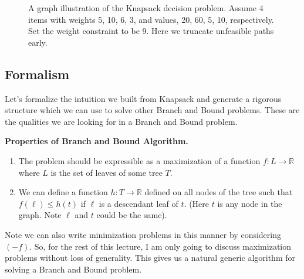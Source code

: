 \documentclass[11pt]{article}
\theoremstyle{plain}
\theoremstyle{definition}
\newcommand{\RR}{\mathbb{R}}
\numberwithin{equation}{section}
\numberwithin{figure}{section}
\begin{document}
\begin{figure}
{
}

\caption{A graph illustration of the Knapsack decision problem. Assume 4 items with weights 5, 10, 6, 3, and values, 20, 60, 5, 10, respectively. Set the weight constraint to be 9. Here we truncate unfeasible paths early.\label{cutknapsack}}
\end{figure}

\subsection{Formalism}
Let's formalize the intuition we built from Knapsack and generate a rigorous structure which we can use to solve other Branch and Bound problems. These are the qualities we are looking for in a Branch and Bound problem.

\begin{framed}
\noindent \textbf{Properties of Branch and Bound Algorithm.} \\
\begin{enumerate}
\item The problem should be expressible as a maximization of a function $f: L \rightarrow \RR$ where $L$ is the set of leaves of some tree $T$.
\item We can define a function $h: T \rightarrow \RR$ defined on all nodes of the tree such that $f(\ell) \leq h(t)$ if $\ell$ is a descendant leaf of $t$. (Here $t$ is any node in the graph. Note $\ell$ and $t$ could be the same).
\end{enumerate}
\end{framed}
\noindent Note we can also write minimization problems in this manner by considering $(-f)$. So, for the rest of this lecture, I am only going to discuss maximization problems without loss of generality. This gives us a natural generic algorithm for solving a Branch and Bound problem.
\end{document}
